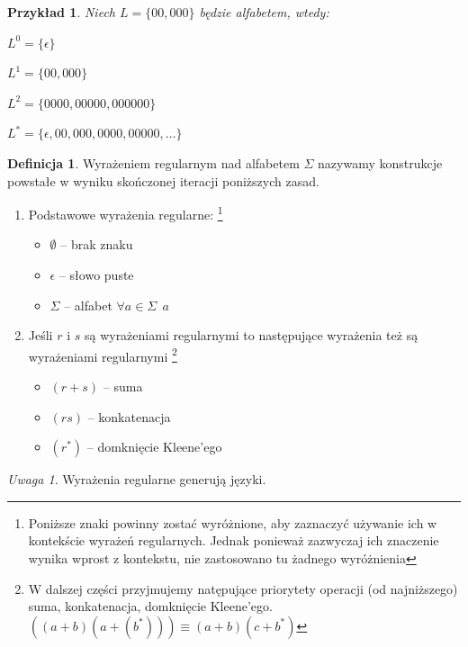\documentclass[12pt,a4paper]{article}
\newtheorem{przyklad}{Przykład}
\theoremstyle{definition}
\newtheorem{df}{Definicja}
\theoremstyle{remark}
\newtheorem{uwaga}{Uwaga}
\begin{document}
	\begin{przyklad}
		Niech $L = \{00, 000\}$ będzie alfabetem, wtedy:\\
		\begin{inparaenum} 
			\item $L^0 = \{\epsilon\}$
			\item $L^1 = \{00, 000\}$
			\item $L^2 = \{0000, 00000, 000000\}$
			\item $L^* = \{\epsilon, 00, 000, 0000, 00000, \dots\}$
		\end{inparaenum}
	\end{przyklad}
	
	\begin{df} Wyrażeniem regularnym nad alfabetem $\Sigma$ nazywamy konstrukcje powstałe w wyniku skończonej iteracji poniższych zasad.
		\begin{enumerate}
			\item Podstawowe wyrażenia regularne: \footnote{Poniższe znaki powinny zostać wyróżnione, aby zaznaczyć używanie ich w kontekście wyrażeń regularnych. 
			Jednak ponieważ zazwyczaj ich znaczenie wynika wprost z kontekstu, nie zastosowano tu żadnego wyróżnienia}
				\begin{itemize}
					\item $\emptyset$ -- brak znaku
					\item $\epsilon$ -- słowo puste
					\item $\Sigma$ -- alfabet $\forall a\in\Sigma ~~ a$
				\end{itemize}
			\item Jeśli $r$ i $s$ są wyrażeniami regularnymi to następujące wyrażenia też są wyrażeniami regularnymi
				\footnote{W dalszej części przyjmujemy natępujące priorytety operacji (od najniższego) suma, konkatenacja, domknięcie Kleene'ego. 
				$((a+b)(a+(b^*))) \equiv (a+b)(c+b^*)$}
				\begin{itemize}
					\item $(r+s)$ -- suma
					\item $(rs)$ -- konkatenacja
					\item $(r^*)$ -- domknięcie Kleene'ego
				\end{itemize}
		\end{enumerate}		
	\end{df}	
	
	\begin{uwaga}
	Wyrażenia regularne generują języki.
	\end{uwaga}
	
\end{document}
